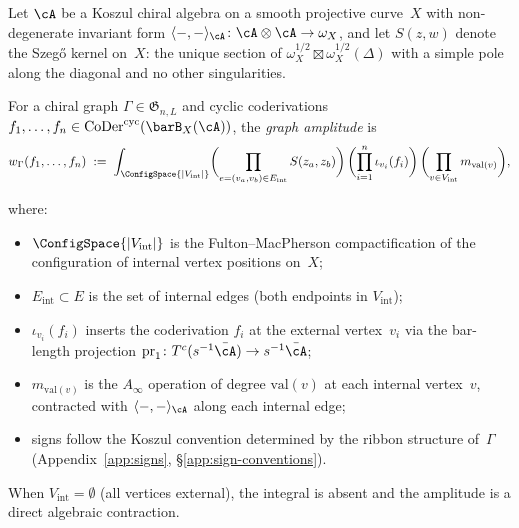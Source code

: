 \begin{definition}\label{def:graph-amplitude}
Let $\cA$ be a Koszul chiral algebra on a smooth projective curve~$X$
with non-degenerate invariant form
$\langle{-},{-}\rangle_{\cA}\colon \cA\otimes\cA\to\omega_X$,
and let $S(z,w)$ denote the Szeg\H{o} kernel on~$X$: the unique
section of
$\omega_X^{1/2} \boxtimes \omega_X^{1/2}(\Delta)$
with a simple pole along the diagonal and no other singularities.

For a chiral graph $\Gamma \in \mathfrak{G}_{n,L}$ and cyclic
coderivations $f_1, \ldots, f_n \in
\operatorname{CoDer}^{\mathrm{cyc}}(\barB_X(\cA))$, the
\emph{graph amplitude} is
\begin{equation}\label{eq:graph-amplitude}
w_\Gamma(f_1, \ldots, f_n)
\;:=\;
\int_{\ConfigSpace{|V_{\mathrm{int}}|}}
\biggl(\prod_{e = (v_a, v_b) \in E_{\mathrm{int}}}
 S(z_a, z_b)\biggr)
\,\biggl(\prod_{i=1}^{n} \iota_{v_i}(f_i)\biggr)
\,\biggl(\prod_{v \in V_{\mathrm{int}}} m_{\mathrm{val}(v)}\biggr),
\end{equation}

where:

\begin{itemize}
\item $\ConfigSpace{|V_{\mathrm{int}}|}$ is the Fulton--MacPherson
 compactification of the configuration of internal vertex positions
 on~$X$;
\item $E_{\mathrm{int}} \subset E$ is the set of internal edges
 (both endpoints in $V_{\mathrm{int}}$);
\item $\iota_{v_i}(f_i)$ inserts the coderivation $f_i$ at the
 external vertex~$v_i$ via the bar-length projection
 $\operatorname{pr}_1\colon T^c(s^{-1}\bar{\cA}) \to
 s^{-1}\bar{\cA}$;
\item $m_{\mathrm{val}(v)}$ is the $A_\infty$ operation of
 degree $\mathrm{val}(v)$ at each internal vertex~$v$, contracted
 with $\langle{-},{-}\rangle_{\cA}$ along each internal edge;
\item signs follow the Koszul convention determined by the ribbon
 structure of~$\Gamma$
 (Appendix~\ref{app:signs}, \S\ref{app:sign-conventions}).
\end{itemize}
When $V_{\mathrm{int}} = \emptyset$ (all vertices external), the
integral is absent and the amplitude is a direct algebraic contraction.
\end{definition}


